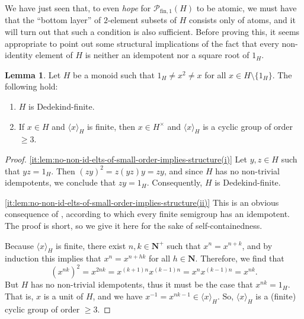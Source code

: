 \documentclass{report}
\renewcommand{\P}{\mathcal{P}}
\newcommand{\gen}[1]{\langle #1 \rangle}
\newcommand{\fun}{{\textrm{fin}, 1}}
\renewcommand{\:}{\text{:}}
\theoremstyle{definition}
\newtheorem{lemma}[defn]{Lemma}
\begin{document}
%
We have just seen that, to even {\it hope} for $\P_\fun(H)$ to be atomic, we must have that the ``bottom layer'' of $2$-element subsets of $H$ consists only of atoms, and it will turn out that such a condition is also sufficient.
Before proving this, it seems appropriate to point out some structural implications of the fact that every non-identity element of $H$ is neither an idempotent nor a square root of $1_H$.
%
\begin{lemma}\label{lem:no-non-id-elts-of-small-order-implies-structure}
	Let $H$ be a monoid such that $1_H \ne x^2 \ne x$ for all $x\in H\setminus\{1_H\}$. The following hold:
	\begin{enumerate}[label={\rm (\roman{*})}]
		\item\label{it:lem:no-non-id-elts-of-small-order-implies-structure(i)}
		$H$ is Dedekind-finite.
		\item\label{it:lem:no-non-id-elts-of-small-order-implies-structure(ii)}
		If $x \in H$ and $\gen{x}_H$ is finite, then $x \in H^\times$ and $\gen{x}_H$ is a cyclic group of order $\ge 3$.
	\end{enumerate}
\end{lemma}
%
\begin{proof}
	\ref{it:lem:no-non-id-elts-of-small-order-implies-structure(i)}
	Let $y,z\in H$ such that $yz = 1_H$. Then $(zy)^2 = z(yz)y = zy$, and since $H$ has no non-trivial i\-dem\-po\-tents, we conclude that $zy=1_H$. Consequently, $H$ is Dedekind-finite.
	
	\ref{it:lem:no-non-id-elts-of-small-order-implies-structure(ii)}
	This is an obvious consequence of \cite[Ch. V, Exercise 4, p. 68]{whitelaw}, according to which every finite semigroup has an idempotent.
	The proof is short, so we give it here for the sake of self-containedness.
	
	Because $\gen{x}_H$ is finite, there exist $n, k \in \mathbf N^+$ such that $x^n = x^{n+k}$, and by induction this implies that $x^n = x^{n+hk}$ for all $h \in \mathbf N$. Therefore, we find that
	\[
	(x^{nk})^2 = x^{2nk} = x^{(k+1)n}x^{(k-1)n} = x^n x^{(k-1)n} = x^{nk}.
	\]
	But $H$ has no non-trivial idempotents, thus it must be the case that $x^{nk}=1_H$. That is, $x$ is a unit of $H$, and we have $x^{-1} = x^{nk-1} \in \gen{x}_H$. So, $\gen{x}_H$ is a (finite) cyclic group of order $\ge 3$.
\end{proof}

%
\end{document}

